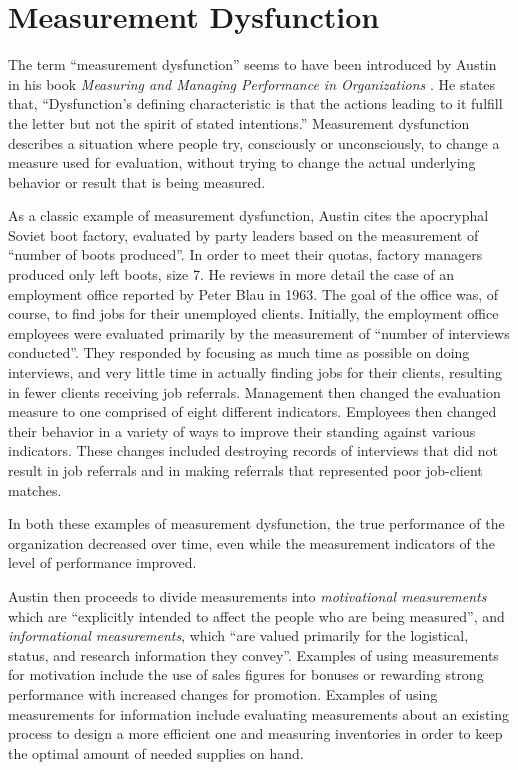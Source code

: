 \section{Measurement Dysfunction}

The term ``measurement dysfunction'' seems to have been introduced by
Austin in his book {\it Measuring and Managing Performance in
  Organizations} \cite{Austin96}.  He states that, ``Dysfunction's defining
characteristic is that the actions leading to it fulfill the letter but not
the spirit of stated intentions.''  Measurement dysfunction describes a
situation where people try, consciously or unconsciously, to change a
measure used for evaluation, without trying to change the actual underlying
behavior or result that is being measured.

As a classic example of measurement dysfunction, Austin cites the
apocryphal Soviet boot factory, evaluated by party leaders based on the
measurement of ``number of boots produced''.  In order to meet their
quotas, factory managers produced only left boots, size 7.  He reviews in
more detail the case of an employment office reported by Peter Blau in
1963.  The goal of the office was, of course, to find jobs for their
unemployed clients.  Initially, the employment office employees were
evaluated primarily by the measurement of ``number of interviews
conducted''.  They responded by focusing as much time as possible on doing
interviews, and very little time in actually finding jobs for their
clients, resulting in fewer clients receiving job referrals.  Management
then changed the evaluation measure to one comprised of eight different
indicators.  Employees then changed their behavior in a variety of ways to
improve their standing against various indicators.  These changes included
destroying records of interviews that did not result in job referrals and
in making referrals that represented poor job-client matches.

\newpage
In both these examples of measurement dysfunction, the true performance of
the organization decreased over time, even while the measurement indicators
of the level of performance improved.

Austin then proceeds to divide measurements into {\it motivational
  measurements} which are ``explicitly intended to affect the people who
are being measured'', and {\it informational measurements}, which ``are
valued primarily for the logistical, status, and research information they
convey''.  Examples of using measurements for motivation include the use of
sales figures for bonuses or rewarding strong performance with increased
changes for promotion.  Examples of using measurements for information
include evaluating measurements about an existing process to design a more
efficient one and measuring inventories in order to keep the optimal amount
of needed supplies on hand.

